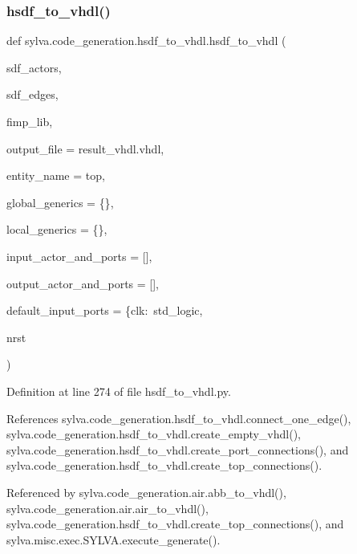 \subsubsection{\texorpdfstring{hsdf\+\_\+to\+\_\+vhdl()}{hsdf\_to\_vhdl()}}
{\footnotesize\ttfamily def sylva.\+code\+\_\+generation.\+hsdf\+\_\+to\+\_\+vhdl.\+hsdf\+\_\+to\+\_\+vhdl (\begin{DoxyParamCaption}\item[{}]{sdf\+\_\+actors,  }\item[{}]{sdf\+\_\+edges,  }\item[{}]{fimp\+\_\+lib,  }\item[{}]{output\+\_\+file = {\ttfamily \textquotesingle{}result\+\_\+vhdl.vhdl\textquotesingle{}},  }\item[{}]{entity\+\_\+name = {\ttfamily \textquotesingle{}top\textquotesingle{}},  }\item[{}]{global\+\_\+generics = {\ttfamily \{\}},  }\item[{}]{local\+\_\+generics = {\ttfamily \{\}},  }\item[{}]{input\+\_\+actor\+\_\+and\+\_\+ports = {\ttfamily \mbox{[}\mbox{]}},  }\item[{}]{output\+\_\+actor\+\_\+and\+\_\+ports = {\ttfamily \mbox{[}\mbox{]}},  }\item[{}]{default\+\_\+input\+\_\+ports = {\ttfamily \{\textquotesingle{}clk\textquotesingle{}\+:~\textquotesingle{}std\+\_\+logic\textquotesingle{}},  }\item[{}]{nrst }\end{DoxyParamCaption})}



Definition at line 274 of file hsdf\+\_\+to\+\_\+vhdl.\+py.



References sylva.\+code\+\_\+generation.\+hsdf\+\_\+to\+\_\+vhdl.\+connect\+\_\+one\+\_\+edge(), sylva.\+code\+\_\+generation.\+hsdf\+\_\+to\+\_\+vhdl.\+create\+\_\+empty\+\_\+vhdl(), sylva.\+code\+\_\+generation.\+hsdf\+\_\+to\+\_\+vhdl.\+create\+\_\+port\+\_\+connections(), and sylva.\+code\+\_\+generation.\+hsdf\+\_\+to\+\_\+vhdl.\+create\+\_\+top\+\_\+connections().



Referenced by sylva.\+code\+\_\+generation.\+air.\+abb\+\_\+to\+\_\+vhdl(), sylva.\+code\+\_\+generation.\+air.\+air\+\_\+to\+\_\+vhdl(), sylva.\+code\+\_\+generation.\+hsdf\+\_\+to\+\_\+vhdl.\+create\+\_\+top\+\_\+connections(), and sylva.\+misc.\+exec.\+S\+Y\+L\+V\+A.\+execute\+\_\+generate().


